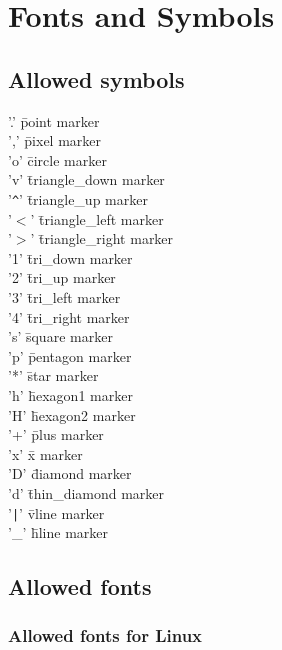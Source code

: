\section{Fonts and Symbols}

\subsection{Allowed symbols}
\label{sec:regions.symbols}

\begin{tabbing}
'.' \=   point marker \\
',' \=   pixel marker\\
'o' \=   circle marker\\
'v' \=   triangle\_down marker\\
'\verb=^=' \=   triangle\_up marker\\
'$<$' \=   triangle\_left marker\\
'$>$' \=   triangle\_right marker\\
'1' \=   tri\_down marker\\
'2' \=   tri\_up marker\\
'3' \=   tri\_left marker\\
'4' \=   tri\_right marker\\
's' \=   square marker\\
'p' \=   pentagon marker\\
'*' \=   star marker\\
'h' \=   hexagon1 marker\\
'H' \=   hexagon2 marker\\
'+' \=   plus marker\\
'x' \=   x marker\\
'D' \=   diamond marker\\
'd' \=   thin\_diamond marker\\
'\verb=|=' \=   vline marker\\
'\_' \=   hline marker\\
\end{tabbing}


\subsection{Allowed fonts}
\label{sec:regions.fonts}

\subsubsection{Allowed fonts for Linux}

